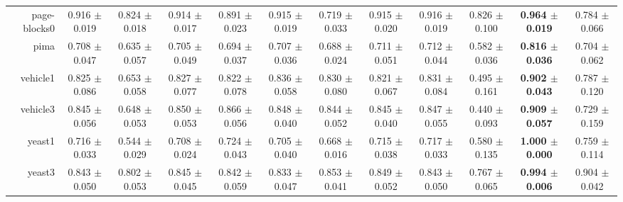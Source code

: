 \begin{table}[!ht]
{\begin{tabular}{r c c c c c c c c c c c}
page-blocks0 & 0.916 $\pm$ 0.019 & 0.824 $\pm$ 0.018 & 0.914 $\pm$ 0.017 & 0.891 $\pm$ 0.023 & 0.915 $\pm$ 0.019 & 0.719 $\pm$ 0.033 & 0.915 $\pm$ 0.020 & 0.916 $\pm$ 0.019 & 0.826 $\pm$ 0.100 & \textbf{0.964 $\pm$ 0.019} & 0.784 $\pm$ 0.066 \\
pima & 0.708 $\pm$ 0.047 & 0.635 $\pm$ 0.057 & 0.705 $\pm$ 0.049 & 0.694 $\pm$ 0.037 & 0.707 $\pm$ 0.036 & 0.688 $\pm$ 0.024 & 0.711 $\pm$ 0.051 & 0.712 $\pm$ 0.044 & 0.582 $\pm$ 0.036 & \textbf{0.816 $\pm$ 0.036} & 0.704 $\pm$ 0.062 \\
vehicle1 & 0.825 $\pm$ 0.086 & 0.653 $\pm$ 0.058 & 0.827 $\pm$ 0.077 & 0.822 $\pm$ 0.078 & 0.836 $\pm$ 0.058 & 0.830 $\pm$ 0.080 & 0.821 $\pm$ 0.067 & 0.831 $\pm$ 0.084 & 0.495 $\pm$ 0.161 & \textbf{0.902 $\pm$ 0.043} & 0.787 $\pm$ 0.120 \\
vehicle3 & 0.845 $\pm$ 0.056 & 0.648 $\pm$ 0.053 & 0.850 $\pm$ 0.053 & 0.866 $\pm$ 0.056 & 0.848 $\pm$ 0.040 & 0.844 $\pm$ 0.052 & 0.845 $\pm$ 0.040 & 0.847 $\pm$ 0.055 & 0.440 $\pm$ 0.093 & \textbf{0.909 $\pm$ 0.057} & 0.729 $\pm$ 0.159 \\
yeast1 & 0.716 $\pm$ 0.033 & 0.544 $\pm$ 0.029 & 0.708 $\pm$ 0.024 & 0.724 $\pm$ 0.043 & 0.705 $\pm$ 0.040 & 0.668 $\pm$ 0.016 & 0.715 $\pm$ 0.038 & 0.717 $\pm$ 0.033 & 0.580 $\pm$ 0.135 & \textbf{1.000 $\pm$ 0.000} & 0.759 $\pm$ 0.114 \\
yeast3 & 0.843 $\pm$ 0.050 & 0.802 $\pm$ 0.053 & 0.845 $\pm$ 0.045 & 0.842 $\pm$ 0.059 & 0.833 $\pm$ 0.047 & 0.853 $\pm$ 0.041 & 0.849 $\pm$ 0.052 & 0.843 $\pm$ 0.050 & 0.767 $\pm$ 0.065 & \textbf{0.994 $\pm$ 0.006} & 0.904 $\pm$ 0.042 \\
\end{tabular}}
\end{table}
